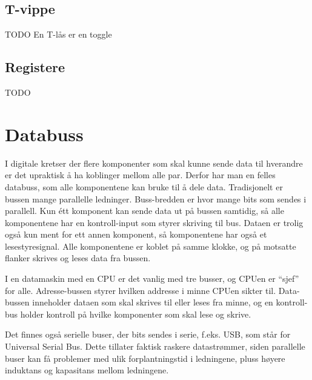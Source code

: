 \documentclass[12pt,a4paper,norsk]{article}
\begin{document}
\subsection{T-vippe}
TODO
En T-lås er en toggle

\subsection{Registere}
TODO

\section{Databuss}
I digitale kretser der flere komponenter som skal kunne sende data til hverandre
er det upraktisk å ha koblinger mellom alle par. Derfor har man en felles
databuss, som alle komponentene kan bruke til å dele data. Tradisjonelt er
bussen mange parallelle ledninger. Buss-bredden er hvor mange bits som sendes i
parallell. Kun étt komponent kan sende data ut på bussen samtidig, så alle
komponentene har en kontroll-input som styrer skriving til bus. Dataen er trolig
også kun ment for ett annen komponent, så komponentene har også et
lesestyresignal. Alle komponentene er koblet på samme klokke, og på motsatte
flanker skrives og leses data fra bussen.

I en datamaskin med en CPU er det vanlig med tre busser, og CPUen er ``sjef''
for alle. Adresse-bussen styrer hvilken addresse i minne CPUen sikter til.
Data-bussen inneholder dataen som skal skrives til eller leses fra minne, og en
kontroll-bus holder kontroll på hvilke komponenter som skal lese og skrive.

Det finnes også serielle buser, der bits sendes i serie, f.eks. USB, som står
for Universal Serial Bus. Dette tillater faktisk raskere datastrømmer, siden
parallelle buser kan få problemer med ulik forplantningstid i ledningene, pluss
høyere induktans og kapasitans mellom ledningene.
\end{document}
